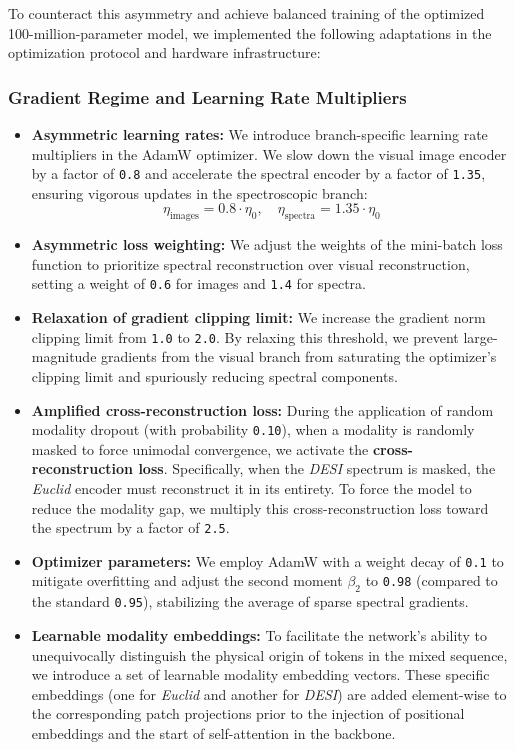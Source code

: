 To counteract this asymmetry and achieve balanced training of the optimized 100-million-parameter model, we implemented the following adaptations in the optimization protocol and hardware infrastructure:

\subsubsection{Gradient Regime and Learning Rate Multipliers}

\begin{itemize}
\item \textbf{Asymmetric learning rates:} We introduce branch-specific learning rate multipliers in the AdamW optimizer. We slow down the visual image encoder by a factor of \texttt{0.8} and accelerate the spectral encoder by a factor of \texttt{1.35}, ensuring vigorous updates in the spectroscopic branch:
    \begin{equation}
    \eta_{\text{images}} = 0.8 \cdot \eta_0, \quad \eta_{\text{spectra}} = 1.35 \cdot \eta_0
    \label{eq:learning_rates}
    \end{equation}
\item \textbf{Asymmetric loss weighting:} We adjust the weights of the mini-batch loss function to prioritize spectral reconstruction over visual reconstruction, setting a weight of \texttt{0.6} for images and \texttt{1.4} for spectra.
\item \textbf{Relaxation of gradient clipping limit:} We increase the gradient norm clipping limit from \texttt{1.0} to \texttt{2.0}. By relaxing this threshold, we prevent large-magnitude gradients from the visual branch from saturating the optimizer's clipping limit and spuriously reducing spectral components.
\item \textbf{Amplified cross-reconstruction loss:} During the application of random modality dropout (with probability \texttt{0.10}), when a modality is randomly masked to force unimodal convergence, we activate the \textbf{cross-reconstruction loss}. Specifically, when the \textit{DESI} spectrum is masked, the \textit{Euclid} encoder must reconstruct it in its entirety. To force the model to reduce the modality gap, we multiply this cross-reconstruction loss toward the spectrum by a factor of \texttt{2.5}.
\item \textbf{Optimizer parameters:} We employ AdamW with a weight decay of \texttt{0.1} to mitigate overfitting and adjust the second moment $\beta_2$ to \texttt{0.98} (compared to the standard \texttt{0.95}), stabilizing the average of sparse spectral gradients.
\item \textbf{Learnable modality embeddings:} To facilitate the network's ability to unequivocally distinguish the physical origin of tokens in the mixed sequence, we introduce a set of learnable modality embedding vectors. These specific embeddings (one for \textit{Euclid} and another for \textit{DESI}) are added element-wise to the corresponding patch projections prior to the injection of positional embeddings and the start of self-attention in the backbone.
\end{itemize}

